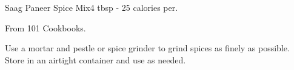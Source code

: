 \begin{recipe}{Saag Paneer Spice Mix}{4 tbsp - 25 calories per.}{}

\freeform From 101 Cookbooks.


Use a mortar and pestle or spice grinder to grind spices as finely as possible. Store in an airtight container and use as needed.

\end{recipe}